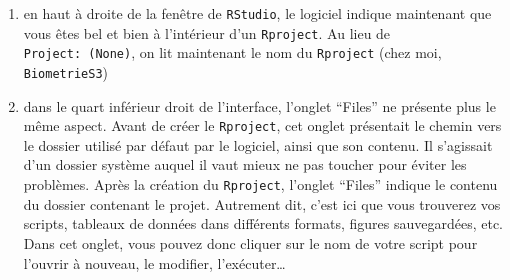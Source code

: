 \documentclass[
  a4paper,
  DIV=11,
  numbers=noendperiod,
  oneside]{scrreprt}
\providecommand{\tightlist}{%
  \setlength{\itemsep}{0pt}\setlength{\parskip}{0pt}}\usepackage{longtable,booktabs,array}
\begin{document}
\begin{enumerate}
\def\labelenumi{\arabic{enumi}.}
\tightlist
\item
  en haut à droite de la fenêtre de \texttt{RStudio}, le logiciel
  indique maintenant que vous êtes bel et bien à l'intérieur d'un
  \texttt{Rproject}. Au lieu de \texttt{Project:\ (None)}, on lit
  maintenant le nom du \texttt{Rproject} (chez moi,
  \texttt{BiometrieS3})
\item
  dans le quart inférieur droit de l'interface, l'onglet ``Files'' ne
  présente plus le même aspect. Avant de créer le \texttt{Rproject}, cet
  onglet présentait le chemin vers le dossier utilisé par défaut par le
  logiciel, ainsi que son contenu. Il s'agissait d'un dossier système
  auquel il vaut mieux ne pas toucher pour éviter les problèmes. Après
  la création du \texttt{Rproject}, l'onglet ``Files'' indique le
  contenu du dossier contenant le projet. Autrement dit, c'est ici que
  vous trouverez vos scripts, tableaux de données dans différents
  formats, figures sauvegardées, etc. Dans cet onglet, vous pouvez donc
  cliquer sur le nom de votre script pour l'ouvrir à nouveau, le
  modifier, l'exécuter\ldots{}
\end{enumerate}
\end{document}

